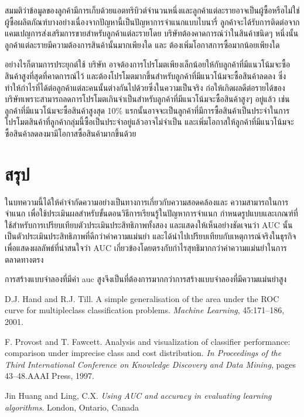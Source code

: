 \documentclass[twoside, twocolumn, 12pt]{article}
\begin{document}
สมมติว่าข้อมูลของลูกค้ามีการเก็บด้วยแอตทริบิวต์จำนวนหนึ่งและลูกค้าแต่ละรายอาจเป็นผู้ซื้อหรือไม่ใช่ผู้ซื้อผลิตภัณฑ์บางอย่างเนื่องจากปัญหานี้เป็นปัญหาการจำแนกแบบไบนารี่ ลูกค้าจะได้รับการติดต่อจากแคมเปญการส่งเสริมการขายสำหรับลูกค้าแต่ละรายโดย บริษัทต้องคาดการณ์ว่าในสินค้าชนิดๆ หนึ่งนั้นลูกค้าแต่ละรายมีความต้องการสินค้านั้นมากเพียงใด และ ต้องเพิ่มโอกาสการซื้อมากน้อยเพียงใด

อย่างไรก็ตามการประยุกต์ใช้ บริษัท อาจต้องการโปรโมตเพียงเล็กน้อยให้กับลูกค้าที่มีแนวโน้มจะซื้อสินค้าสูงที่สุดที่คาดการณ์ไว้ และต้องโปรโมตมากขึ้นสำหรับลูกค้าที่มีแนวโน้มจะซื้อสินค้าลดลง ซึ่งทำให้กำไรที่ได้ต่อลูกค้าแต่ละคนนั้นต่างกันไปด้วยซึ่งในความเป็นจริง ก่อให้เกิดผลดีต่อรายได้ของบริษัทเพราะสามารถลดการโปรโมตเกินจำเป็นสำหรับลูกค้าที่มีแนวโน้มจะซื้อสินค้าสูงๆ อยู่แล้ว เช่น ลูกค้าที่มีแนวโน้มจะซื้อสินค้าสูงสุด 10\% แรกนั้นอาจจะเป็นลูกค้าที่มีการซื้อสินค้าเป็นประจำในการโปรโมตสินค้าที่ลูกค้ากลุ่มนี้ซื้อเป็นประจำอยู่แล้วอาจไม่จำเป็น และเพิ่มโอกาสให้ลูกค้าที่มีแนวโน้มจะซื้อสินค้าลดลงมามีโอกาสซื้อสินค้ามากขึ้นด้วย 
\section{สรุป}
\quad ในบทความนี้ได้ให้คำจำกัดความอย่างเป็นทางการเกี่ยวกับความสอดคล้องและ ความสามารถในการจำแนก เพื่อใช้ประเมินผลสำหรับขั้นตอนวิธีการเรียนรู้ในปัญหาการจำแนก กำหนดรูปแบบและเกณฑ์ที่ใช้สำหรับการเปรียบเทียบตัวประเมินประสิทธิภาพทั้งสอง และแสดงให้เห็นอย่างชัดเจนว่า AUC นั้นเป็นตัวประเมินประสิทธิภาพที่ดีกว่าค่าความแม่นยำ และได้นำไปเปรียบเทียบกับเหตุการณ์จริงในธุรกิจเพื่อแสดงผลลัพธ์ที่น่าสนใจว่า AUC เกี่ยวข้องโดยตรงกับกำไรสุทธิมากกว่าค่าความแม่นยำในการตลาดทางตรง

การสร้างแบบจำลองที่มีค่า auc สูงจึงเป็นที่ต้องการมากกว่าการสร้างแบบจำลองที่มีความแม่นยำสูง
\renewcommand\refname{ข้อมูลอ้างอิง}

\begin{thebibliography}{9}

D.J. Hand and R.J. Till. A simple generalisation of the area under the ROC curve for multipleclass classification problems. \textit{Machine Learning}, 45:171–186, 2001.

F. Provost and T. Fawcett. Analysis and visualization of classifier performance: comparison under imprecise class and cost distribution. \textit{In Proceedings of the Third International Conference on Knowledge Discovery and Data Mining}, pages 43–48.AAAI Press, 1997.

{Jin Huang} and Ling, C.X. \textit{Using {AUC} and accuracy in evaluating learning algorithms}. London, Ontario, Canada


\end{thebibliography}
\end{document}
